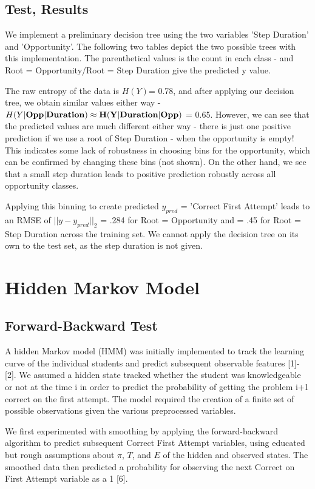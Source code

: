 \documentclass{article} %
\begin{document}
\subsection{Test, Results}
We implement a preliminary decision tree using the two variables 'Step Duration' and 'Opportunity'. The following two tables depict the two possible trees with this implementation. The parenthetical values is the count in each class - and Root = Opportunity/Root = Step Duration give the predicted y value.




The raw entropy of the data is $H(Y)$= 0.78, and after applying our decision tree, we obtain similar values either way - $H(Y|\bf{Opp}|\bf{Duration}) \approx H(Y|\bf{Duration}|\bf{Opp})$ = 0.65. However, we can see that the predicted values are much different either way - there is just one positive prediction if we use a root of Step Duration - when the opportunity is empty! This indicates some lack of robustness in choosing bins for the opportunity, which can be confirmed by changing these bins (not shown). On the other hand, we see that a small step duration leads to positive prediction robustly across all opportunity classes.

Applying this binning to create predicted $y_{pred}$ = 'Correct First Attempt' leads to an RMSE of $||y - y_{pred}||_2$ = .284 for Root = Opportunity and = .45 for Root = Step Duration across the training set. We cannot apply the decision tree on its own to the test set, as the step duration is not given.

\section{Hidden Markov Model}\label{HMM_sec}
\subsection{Forward-Backward Test}
A hidden Markov model (HMM) was initially implemented to track the learning curve of the individual students and predict subsequent observable features [1]-[2]. We assumed a hidden state tracked whether the student was knowledgeable or not at the time i in order to predict the probability of getting the problem i+1 correct on the first attempt. The model required the creation of a finite set of possible observations given the various preprocessed variables. 

We first experimented with smoothing by applying the forward-backward algorithm to predict subsequent Correct First Attempt variables, using educated but rough assumptions about $\pi$, $T$, and $E$ of the hidden and observed states. The smoothed data then predicted a probability for observing the next Correct on First Attempt variable as a 1 [6].
\end{document}
